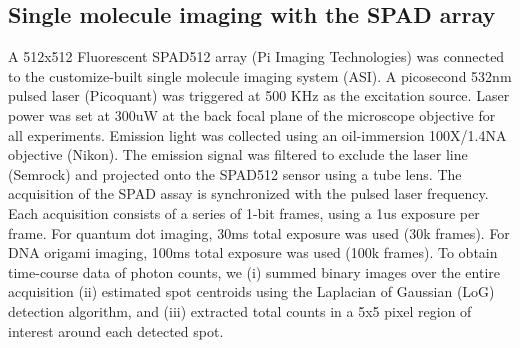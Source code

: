\subsection{Single molecule imaging with the SPAD array}

A 512x512 Fluorescent SPAD512 array (Pi Imaging Technologies) was connected to the customize-built single molecule imaging system (ASI). A picosecond 532nm pulsed laser (Picoquant) was triggered at 500 KHz as the excitation source. Laser power was set at 300uW at the back focal plane of the microscope objective for all experiments. Emission light was collected using an oil-immersion 100X/1.4NA objective (Nikon). The emission signal was filtered to exclude the laser line (Semrock) and projected onto the SPAD512 sensor using a tube lens. The acquisition of the SPAD assay is synchronized with the pulsed laser frequency. Each acquisition consists of a series of 1-bit frames, using a 1us exposure per frame. For quantum dot imaging, 30ms total exposure was used (30k frames). For DNA origami imaging, 100ms total exposure was used (100k frames). To obtain time-course data of photon counts, we (i) summed binary images over the entire acquisition (ii) estimated spot centroids using the Laplacian of Gaussian (LoG) detection algorithm, and (iii) extracted total counts in a 5x5 pixel region of interest around each detected spot. 





